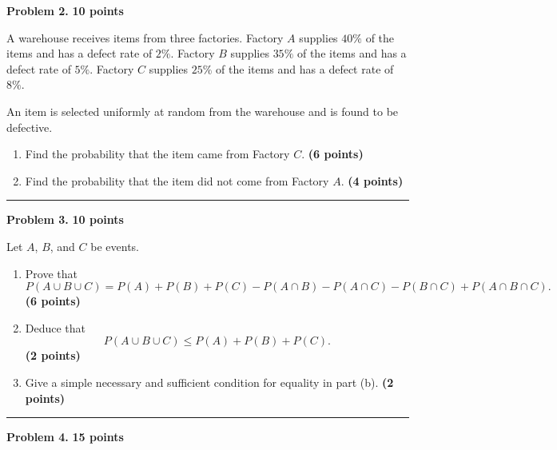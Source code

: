 \documentclass[11pt]{article}
\begin{document}
\begin{problemheader}
\textbf{Problem 2. } \hfill \textbf{10 points}
\end{problemheader}

A warehouse receives items from three factories. Factory $A$ supplies $40\%$ of the items and has a defect rate of $2\%$. Factory $B$ supplies $35\%$ of the items and has a defect rate of $5\%$. Factory $C$ supplies $25\%$ of the items and has a defect rate of $8\%$.

An item is selected uniformly at random from the warehouse and is found to be defective.

\begin{enumerate}[label=(\alph*),leftmargin=*,itemsep=0.7em]
    \item Find the probability that the item came from Factory $C$. \hfill \textbf{(6 points)}
    \item Find the probability that the item did not come from Factory $A$. \hfill \textbf{(4 points)}
\end{enumerate}

\vspace{2mm}\hrule
\newpage

\begin{problemheader}
\textbf{Problem 3. } \hfill \textbf{10 points}
\end{problemheader}

Let $A$, $B$, and $C$ be events.

\begin{enumerate}[label=(\alph*),leftmargin=*,itemsep=0.75em]
    \item Prove that
    \[
    P(A\cup B\cup C)
    =P(A)+P(B)+P(C)
    -P(A\cap B)-P(A\cap C)-P(B\cap C)
    +P(A\cap B\cap C).
    \]
    \hfill \textbf{(6 points)}

    \item Deduce that
    \[
    P(A\cup B\cup C)\leq P(A)+P(B)+P(C).
    \]
    \hfill \textbf{(2 points)}

    \item Give a simple necessary and sufficient condition for equality in part (b). \hfill \textbf{(2 points)}
\end{enumerate}

\vspace{2mm}\hrule
\newpage

\begin{problemheader}
\textbf{Problem 4.} \hfill \textbf{15 points}
\end{problemheader}
\end{document}
